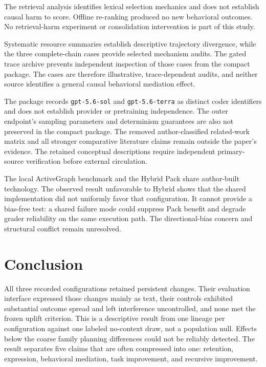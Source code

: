 \documentclass[10pt,twocolumn]{article}
\begin{document}
The retrieval analysis identifies lexical selection mechanics and does
not establish causal harm to score. Offline re-ranking produced no new
behavioral outcomes. No retrieval-harm experiment or consolidation
intervention is part of this study.

Systematic resource summaries establish descriptive trajectory
divergence, while the three complete-chain cases provide selected
mechanism audits. The gated trace archive prevents independent
inspection of those cases from the compact package. The cases are
therefore illustrative, trace-dependent audits, and neither source
identifies a general causal behavioral mediation effect.

The package records \texttt{gpt-5.6-sol} and \texttt{gpt-5.6-terra} as
distinct coder identifiers and does not establish provider or
pretraining independence. The outer endpoint's sampling parameters and
determinism guarantees are also not preserved in the compact package.
The removed author-classified related-work matrix and all stronger
comparative literature claims remain outside the paper's evidence. The
retained conceptual descriptions require independent primary-source
verification before external circulation.

The local ActiveGraph benchmark and the Hybrid Pack share author-built
technology. The observed result unfavorable to Hybrid shows that the
shared implementation did not uniformly favor that configuration. It
cannot provide a bias-free test: a shared failure mode could suppress
Pack benefit and degrade grader reliability on the same execution path.
The directional-bias concern and structural conflict remain unresolved.

\section{Conclusion}\label{conclusion}

All three recorded configurations retained persistent changes. Their
evaluation interface expressed those changes mainly as text, their
controls exhibited substantial outcome spread and left interference
uncontrolled, and none met the frozen uplift criterion. This is a
descriptive result from one lineage per configuration against one
labeled no-context draw, not a population null. Effects below the coarse
family planning differences could not be reliably detected. The result
separates five claims that are often compressed into one: retention,
expression, behavioral mediation, task improvement, and recursive
improvement.
\end{document}
